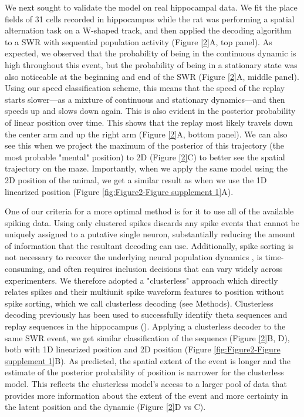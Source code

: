 \documentclass[times, twoside]{zHenriquesLab-StyleBioRxiv}
\begin{document}
We next sought to validate the model on real hippocampal data. We fit the place fields of 31 cells recorded in hippocampus while the rat was performing a spatial alternation task on a W-shaped track, and then applied the decoding algorithm to a SWR with sequential population activity (Figure \ref{2}A, top panel). As expected, we observed that the probability of being in the continuous dynamic is high throughout this event, but the probability of being in a stationary state was also noticeable at the beginning and end of the SWR (Figure \ref{2}A, middle panel). Using our speed classification scheme, this means that the speed of the replay starts slower---as a mixture of continuous and stationary dynamics---and then speeds up and slows down again. This is also evident in the posterior probability of linear position over time. This shows that the replay most likely travels down the center arm and up the right arm (Figure \ref{2}A, bottom panel). We can also see this when we project the maximum of the posterior of this trajectory (the most probable "mental" position) to 2D (Figure \ref{2}C) to better see the spatial trajectory on the maze. Importantly, when we apply the same model using the 2D position of the animal, we get a similar result as when we use the 1D linearized position (Figure \ref{fig:Figure2-Figure supplement 1}A).

One of our criteria for a more optimal method is for it to use all of the available spiking data. Using only clustered spikes discards any spike events that cannot be uniquely assigned to a putative single neuron, substantially reducing the amount of information that the resultant decoding can use. Additionally, spike sorting is not necessary to recover the underlying neural population dynamics \cite{TrautmannAccurateEstimationNeural2019}, is time-consuming, and often requires inclusion decisions that can vary widely across experimenters. We therefore adopted a "clusterless" approach which directly relates spikes and their multiunit spike waveform features to position without spike sorting, which we call clusterless decoding (see Methods). Clusterless decoding previously has been used to successfully identify theta sequences and replay sequences in the hippocampus (\cite{KloostermanBayesiandecodingusing2014, ChenTransductiveneuraldecoding2012,DengRapidclassificationhippocampal2016, KayConstantSubsecondCycling2020}). Applying a clusterless decoder to the same SWR event, we get similar classification of the sequence (Figure \ref{2}B, D), both with 1D linearized position and 2D position (Figure \ref{fig:Figure2-Figure supplement 1}B). As predicted, the spatial extent of the event is longer and the estimate of the posterior probability of position is narrower for the clusterless model. This reflects the clusterless model's access to a larger pool of data that provides more information about the extent of the event and more certainty in the latent position and the dynamic (Figure \ref{2}D vs C).
\end{document}
